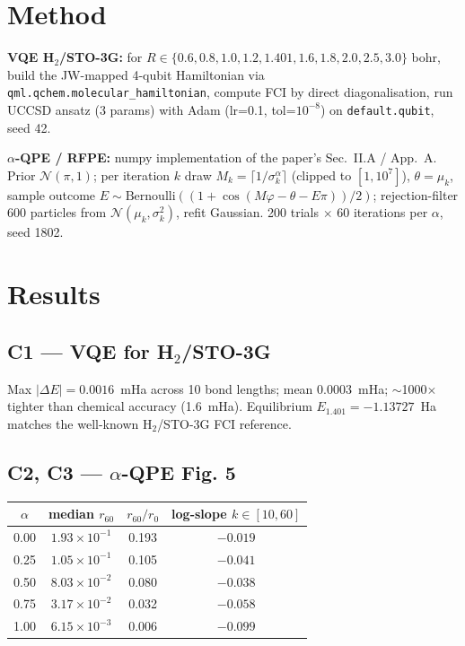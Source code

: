 \documentclass[11pt]{article}
\begin{document}
\section{Method}

\textbf{VQE H$_2$/STO-3G:} for $R \in \{0.6, 0.8, 1.0, 1.2, 1.401, 1.6, 1.8, 2.0, 2.5, 3.0\}$
bohr, build the JW-mapped 4-qubit Hamiltonian via
\texttt{qml.qchem.molecular\_hamiltonian}, compute FCI by direct
diagonalisation, run UCCSD ansatz (3 params) with Adam (lr=0.1, tol=$10^{-8}$)
on \texttt{default.qubit}, seed 42.

\textbf{$\alpha$-QPE / RFPE:} numpy implementation of the paper's
Sec.~II.A / App.~A. Prior $\mathcal{N}(\pi, 1)$; per iteration $k$ draw
$M_k = \lceil 1/\sigma_k^\alpha\rceil$ (clipped to $[1, 10^7]$), $\theta = \mu_k$,
sample outcome $E\sim \mathrm{Bernoulli}((1+\cos(M\varphi-\theta-E\pi))/2)$;
rejection-filter 600 particles from $\mathcal{N}(\mu_k, \sigma_k^2)$, refit
Gaussian. 200 trials $\times$ 60 iterations per $\alpha$, seed 1802.

\section{Results}

\subsection*{C1 --- VQE for H$_2$/STO-3G}

Max $|\Delta E| = 0.0016$~mHa across 10 bond lengths; mean $0.0003$~mHa;
$\sim$1000$\times$ tighter than chemical accuracy (1.6~mHa). Equilibrium
$E_{1.401} = -1.13727$~Ha matches the well-known H$_2$/STO-3G FCI reference.

\subsection*{C2, C3 --- $\alpha$-QPE Fig. 5}

\begin{center}\begin{tabular}{cccc}
\toprule
$\alpha$ & median $r_{60}$ & $r_{60}/r_0$ & log-slope $k\in[10,60]$ \\
\midrule
0.00 & $1.93\times 10^{-1}$ & 0.193 & $-0.019$ \\
0.25 & $1.05\times 10^{-1}$ & 0.105 & $-0.041$ \\
0.50 & $8.03\times 10^{-2}$ & 0.080 & $-0.038$ \\
0.75 & $3.17\times 10^{-2}$ & 0.032 & $-0.058$ \\
1.00 & $6.15\times 10^{-3}$ & 0.006 & $-0.099$ \\
\bottomrule
\end{tabular}\end{center}
\end{document}
